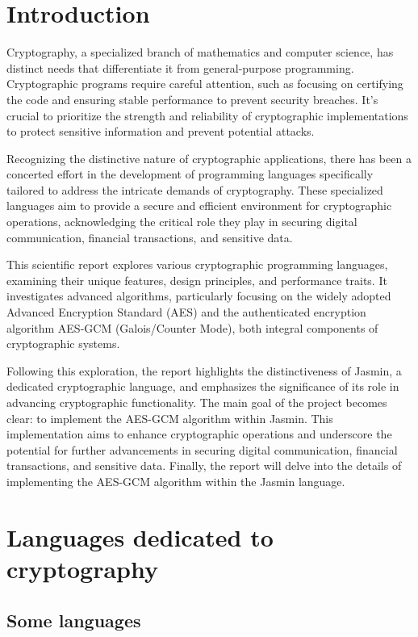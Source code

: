 \documentclass[runningheads]{llncs}
\begin{document}
%

\newpage
\section{Introduction}

Cryptography, a specialized branch of mathematics and computer science, has distinct needs that differentiate it from general-purpose programming. Cryptographic programs require careful attention, such as focusing on certifying the code and ensuring stable performance to prevent security breaches. It's crucial to prioritize the strength and reliability of cryptographic implementations to protect sensitive information and prevent potential attacks.

Recognizing the distinctive nature of cryptographic applications, there has been a concerted effort in the development of programming languages specifically tailored to address the intricate demands of cryptography. These specialized languages aim to provide a secure and efficient environment for cryptographic operations, acknowledging the critical role they play in securing digital communication, financial transactions, and sensitive data.

This scientific report explores various cryptographic programming languages, examining their unique features, design principles, and performance traits. It investigates advanced algorithms, particularly focusing on the widely adopted Advanced Encryption Standard (AES) and the authenticated encryption algorithm AES-GCM (Galois/Counter Mode), both integral components of cryptographic systems.

Following this exploration, the report highlights the distinctiveness of Jasmin, a dedicated cryptographic language, and emphasizes the significance of its role in advancing cryptographic functionality. The main goal of the project becomes clear: to implement the AES-GCM algorithm within Jasmin. This implementation aims to enhance cryptographic operations and underscore the potential for further advancements in securing digital communication, financial transactions, and sensitive data. Finally, the report will delve into the details of implementing the AES-GCM algorithm within the Jasmin language.


\section{Languages dedicated to cryptography}

\subsection{Some languages}
\end{document}
